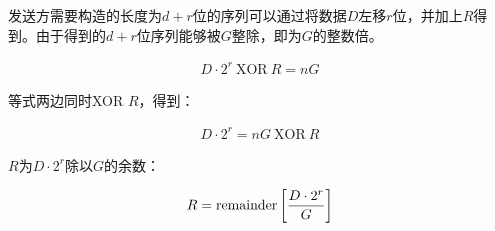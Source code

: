 \vspace{0.5cm}

发送方需要构造的长度为$ d + r $位的序列可以通过将数据$ D $左移$ r $位，并加上$ R $得到。由于得到的$ d + r $位序列能够被$ G $整除，即为$ G $的整数倍。

\vspace{-1cm}

\begin{align*}
    D \cdot 2^r\ \text{XOR}\ R = nG
\end{align*}

等式两边同时XOR $ R $，得到：

\vspace{-1cm}

\begin{align*}
    D \cdot 2^r = nG\ \text{XOR}\ R
\end{align*}

$ R $为$ D \cdot 2^r $除以$ G $的余数：

\vspace{-1cm}

\begin{align*}
    R = \text{remainder}\left[{D \cdot 2^r} \over G\right]
\end{align*}

